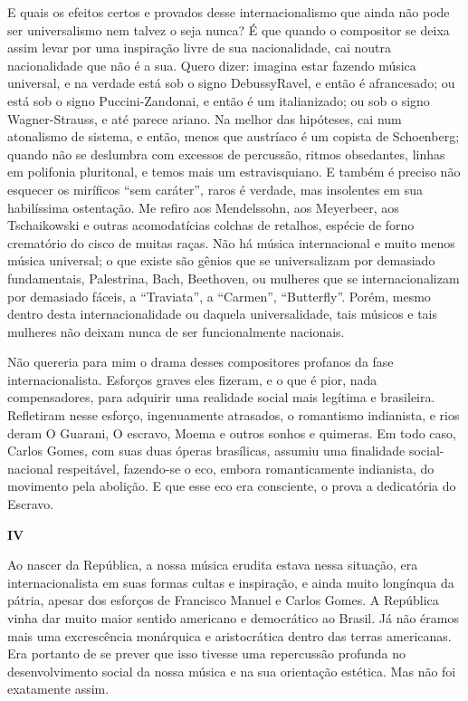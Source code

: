 E quais os efeitos certos e provados desse internacionalismo que ainda
não pode ser universalismo nem talvez o seja nunca? É que quando o
compositor se deixa assim levar por uma inspiração livre de sua
nacionalidade, cai noutra nacionalidade que não é a sua. Quero dizer:
imagina estar fazendo música universal, e na verdade está sob o signo
DebussyRavel, e então é afrancesado; ou está sob o signo
Puccini-Zandonai, e então é um italianizado; ou sob o signo
Wagner-Strauss, e até parece ariano. Na melhor das hipóteses, cai num
atonalismo de sistema, e então, menos que austríaco é um copista de
Schoenberg; quando não se deslumbra com excessos de percussão, ritmos
obsedantes, linhas em polifonia pluritonal, e temos mais um
estravisquiano. E também é preciso não esquecer os miríficos ``sem
caráter'', raros é verdade, mas insolentes em sua habilíssima
ostentação. Me refiro aos Mendelssohn, aos Meyerbeer, aos Tschaikowski e
outras acomodatícias colchas de retalhos, espécie de forno crematório do
cisco de muitas raças. Não há música internacional e muito menos música
universal; o que existe são gênios que se universalizam por demasiado
fundamentais, Palestrina, Bach, Beethoven, ou mulheres que se
internacionalizam por demasiado fáceis, a ``Traviata'', a ``Carmen'',
``Butterfly''. Porém, mesmo dentro desta internacionalidade ou daquela
universalidade, tais músicos e tais mulheres não deixam nunca de ser
funcionalmente nacionais.

Não quereria para mim o drama desses compositores profanos da fase
internacionalista. Esforços graves eles fizeram, e o que é pior, nada
compensadores, para adquirir uma realidade social mais legítima e
brasileira. Refletiram nesse esforço, ingenuamente atrasados, o
romantismo indianista, e rios deram O Guarani, O escravo, Moema e outros
sonhos e quimeras. Em todo caso, Carlos Gomes, com suas duas óperas
brasílicas, assumiu uma finalidade social-nacional respeitável,
fazendo-se o eco, embora romanticamente indianista, do movimento pela
abolição. E que esse eco era consciente, o prova a dedicatória do
Escravo.

\textbf{IV}

Ao nascer da República, a nossa música erudita estava nessa situação,
era internacionalista em suas formas cultas e inspiração, e ainda muito
longínqua da pátria, apesar dos esforços de Francisco Manuel e Carlos
Gomes. A República vinha dar muito maior sentido americano e democrático
ao Brasil. Já não éramos mais uma excrescência monárquica e
aristocrática dentro das terras americanas. Era portanto de se prever
que isso tivesse uma repercussão profunda no desenvolvimento social da
nossa música e na sua orientação estética. Mas não foi exatamente assim.

